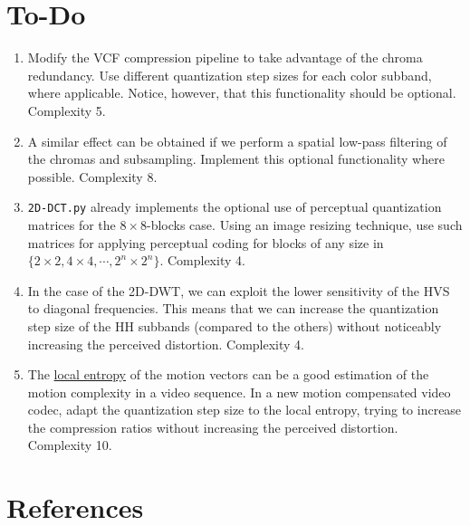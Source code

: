 \section{To-Do}
\begin{enumerate}
\item Modify the VCF compression pipeline to take advantage of the
  chroma redundancy. Use different quantization step sizes for each
  color subband, where applicable. Notice, however, that this
  functionality should be optional. Complexity 5.
\item A similar effect can be obtained if we perform a spatial
  low-pass filtering of the chromas and subsampling. Implement this
  optional functionality where possible. Complexity 8.
\item \texttt{2D-DCT.py} already implements the optional use of
  perceptual quantization matrices for the $8\times 8$-blocks
  case. Using an image resizing technique, use such matrices for
  applying perceptual coding for blocks of any size in
  $\{2\times 2, 4\times 4, \cdots, 2^n\times 2^n\}$. Complexity 4.
\item In the case of the 2D-DWT, we can exploit the lower sensitivity
  of the HVS to diagonal frequencies. This means that we can increase
  the quantization step size of the HH subbands (compared to the
  others) without noticeably increasing the perceived
  distortion. Complexity 4.
\item The
  \href{https://scikit-image.org/docs/stable/auto_examples/filters/plot_entropy.html}{local
    entropy} of the motion vectors can be a good estimation of the
  motion complexity in a video sequence. In a new motion compensated
  video codec, adapt the quantization step size to the local entropy,
  trying to increase the compression ratios without increasing the
  perceived distortion. Complexity 10.
\end{enumerate}

\section{References}

\renewcommand{\addcontentsline}[3]{}%

